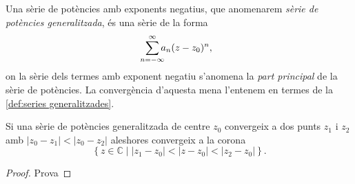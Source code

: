 \documentclass[12pt,twoside]{report}
\numberwithin{table}{section}
\numberwithin{equation}{section}
\numberwithin{figure}{section}
\newcommand{\C}{\ensuremath{\mathbb{C}}}
\newcommand{\set}[2]{\left\{ #1 \mid #2 \right\}}
\newcommand{\abs}[1]{\left\lvert #1 \right\rvert}
\begin{document}
\begin{defn}
	Una sèrie de potències amb exponents negatius, que anomenarem \emph{sèrie de potències generalitzada}, és una sèrie de la forma
	\begin{equation*}
		\sum_{\mathclap{n = -\infty}}^{\infty} a_n(z - z_0)^n, 
	\end{equation*}
	on la sèrie dels termes amb exponent negatiu s'anomena la \emph{part principal} de la sèrie de potències. La convergència d'aquesta mena l'entenem en termes de la \cref{def:series generalitzades}.
\end{defn}

\begin{prop}
	Si una sèrie de potències generalitzada de centre \( z_0 \) convergeix a dos punts \( z_1 \) i \( z_2 \) amb \( \abs{z_0 - z_1} < \abs{z_0 - z_2} \) aleshores convergeix a la corona
	\begin{equation*}
		\set{z \in \C}{\abs{z_1 - z_0} < \abs{z - z_0} < \abs{z_2 - z_0}}.
	\end{equation*}
\end{prop}
\begin{proof}
	Prova
\end{proof}
\end{document}
